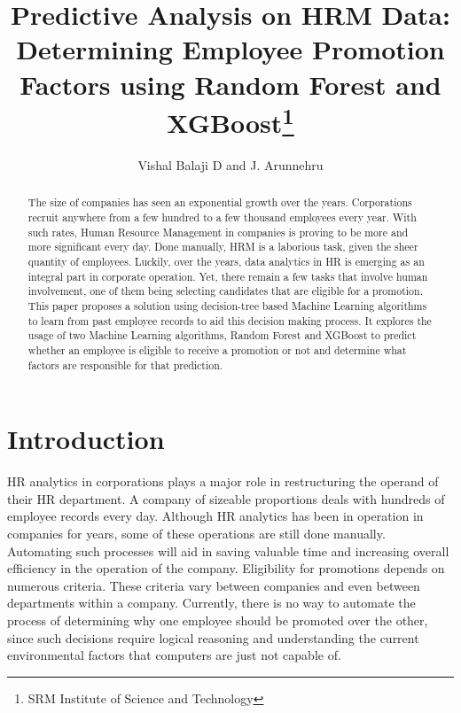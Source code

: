 \documentclass[runningheads]{llncs}
\institute{\textsuperscript{1} Department of Computer Science and
Engineering, SRM Institute of Science and Technology, Vadapalani Campus,
Chennai - 26, \\ \texttt{\{vishalbalaji,arunnehru.aucse\}@gmail.com}}
\title{Predictive Analysis on HRM Data: Determining Employee Promotion
Factors using Random Forest and XGBoost\thanks{SRM Institute of Science
and Technology}}
\author{Vishal Balaji D\inst{1}\orcidID{0000-1111-2222-3333} and J.
Arunnehru\inst{1}\orcidID{1111-2222-3333-4444}}
\date{}
\begin{document}
\maketitle
\begin{abstract}
	The size of companies has seen an exponential growth over the years.
 Corporations recruit anywhere from a few hundred to a few thousand
 employees every year. With such rates, Human Resource Management in
 companies is proving to be more and more significant every day. Done
 manually, HRM is a laborious task, given the sheer quantity of
 employees. Luckily, over the years, data analytics in HR is emerging as
 an integral part in corporate operation. Yet, there remain a few tasks
 that involve human involvement, one of them being selecting candidates
 that are eligible for a promotion. This paper proposes a solution using
 decision-tree based Machine Learning algorithms to learn from past
 employee records to aid this decision making process. It explores the
 usage of two Machine Learning algorithms, Random Forest and XGBoost to
 predict whether an employee is eligible to receive a promotion or not
 and determine what factors are responsible for that prediction.

	
\end{abstract}

\hypertarget{introduction}{%
\section{Introduction}\label{introduction}}

HR analytics\cite{ref_Quddus2019} in corporations
plays a major role in restructuring the operand of their HR department.
A company of sizeable proportions deals with hundreds of employee
records every day. Although HR analytics has been in operation in
companies for years, some of these operations are still done manually.
Automating such processes will aid in saving valuable time and
increasing overall efficiency in the operation of the company.
Eligibility for promotions depends on numerous criteria. These criteria
vary between companies and even between departments within a company.
Currently, there is no way to automate the process of determining why
one employee should be promoted over the other, since such decisions
require logical reasoning and understanding the current environmental
factors that computers are just not capable of.
\end{document}
